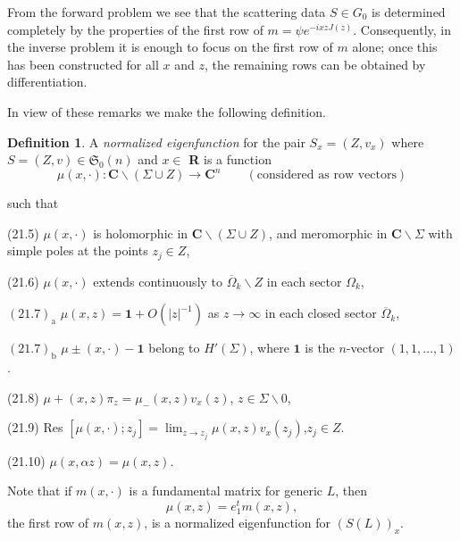 \documentclass{surv-l}
\theoremstyle{plain}
\theoremstyle{definition}
\newtheorem{definition}[theorem]{Definition}
\numberwithin{equation}{chapter}
\begin{document}
From the forward problem we see that the scattering data $S\in G_{0}$ is determined completely by the properties of the first row of $m=\psi e^{-ixzJ(z)}$. Consequently, in the inverse problem it is enough to focus on the first row of $m$ alone; once this has been constructed for all $x$ and $z$, the remaining rows can be obtained by differentiation.

In view of these remarks we make the following definition.
\setcounter{theorem}{3}
\begin{definition}\label{defi21.4}
A \emph{normalized eigenfunction} for the pair $S_{x}= (Z, v_{x})$ where $S=(Z, v)\in \mathfrak{S}_{0}(n)$ and $x\in$ \textbf{R} is a function
\begin{equation*}
\mu(x,\cdot):\mathbf{C}\backslash (\Sigma\cup Z)\rightarrow \mathbf{C}^{n} \qquad  (\text{considered as row vectors})
\end{equation*}
\end{definition}
such that

(21.5) $\mu(x, \cdot)$ is holomorphic in $\mathbf{C}\backslash (\Sigma\cup Z)$, and meromorphic in $ \mathbf{C}\backslash \Sigma$ with simple poles at the points $z_{j}\in Z$,

(21.6) $\mu(x, \cdot)$ extends continuously to $\overline{\Omega}_{k}\backslash Z$ in each sector $\Omega_{k}$,

$\mathrm{(21.7)_{a}}$ $\mu(x,z)=\mathbf{1}+O(|z|^{-1})$ as $ z\rightarrow\infty$ in each closed sector $\overline{\Omega}_{k}$,

$\mathrm{(21.7)_{b}}$ $\mu\pm(x, \cdot)-\mathbf{1}$ belong to $H'(\Sigma)$, where $\mathbf{1}$ is the $n$-vector $(1,1,\ldots, 1)$.

(21.8) $\mu+(x, z)\pi_{z}=\mu_{-}(x,z)v_{x}(z)$, \qquad $z\in\Sigma\backslash 0$,

(21.9)  Res $[\mu(x, \cdot); z_{j}]=\lim_{z\rightarrow z_{j}}\mu(x,z)v_{x}(z_{j})$,\qquad $z_{j}\in Z$.

(21.10) $\mu(x,\alpha z)=\mu(x,z)$.

Note that if $m(x, \cdot)$ is a fundamental matrix for generic $L$, then
\begin{equation*}
\mu(x, z)=e_{1}^{t}m(x,z),
\end{equation*}
the first row of $m(x, z)$, is a normalized eigenfunction for $(S(L))_{x}$.
\end{document}
